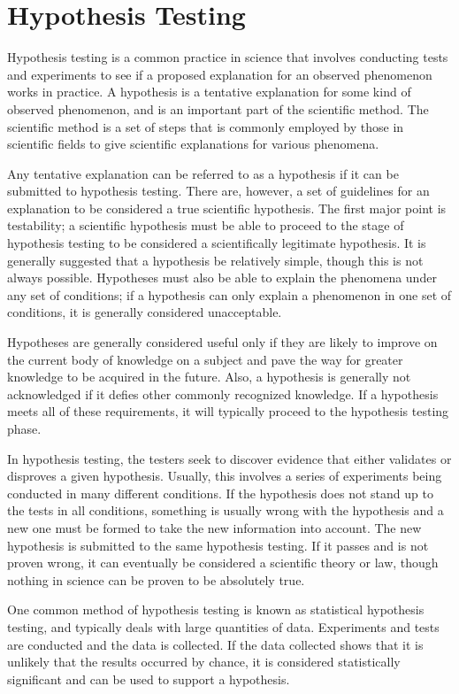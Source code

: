 \section{Hypothesis Testing}


Hypothesis testing is a common practice in science that involves conducting tests and experiments to see if a proposed explanation for an observed phenomenon works in practice. A hypothesis is a tentative explanation for some kind of observed phenomenon, and is an important part of the scientific method. The scientific method is a set of steps that is commonly employed by those in scientific fields to give scientific explanations for various phenomena.

Any tentative explanation can be referred to as a hypothesis if it can be submitted to hypothesis testing. There are, however, a set of guidelines for an explanation to be considered a true scientific hypothesis. The first major point is testability; a scientific hypothesis must be able to proceed to the stage of hypothesis testing to be considered a scientifically legitimate hypothesis. It is generally suggested that a hypothesis be relatively simple, though this is not always possible. Hypotheses must also be able to explain the phenomena under any set of conditions; if a hypothesis can only explain a phenomenon in one set of conditions, it is generally considered unacceptable.

Hypotheses are generally considered useful only if they are likely to improve on the current body of knowledge on a subject and pave the way for greater knowledge to be acquired in the future. Also, a hypothesis is generally not acknowledged if it defies other commonly recognized knowledge. If a hypothesis meets all of these requirements, it will typically proceed to the hypothesis testing phase.

In hypothesis testing, the testers seek to discover evidence that either validates or disproves a given hypothesis. Usually, this involves a series of experiments being conducted in many different conditions. If the hypothesis does not stand up to the tests in all conditions, something is usually wrong with the hypothesis and a new one must be formed to take the new information into account. The new hypothesis is submitted to the same hypothesis testing. If it passes and is not proven wrong, it can eventually be considered a scientific theory or law, though nothing in science can be proven to be absolutely true.

One common method of hypothesis testing is known as statistical hypothesis testing, and typically deals with large quantities of data. Experiments and tests are conducted and the data is collected. If the data collected shows that it is unlikely that the results occurred by chance, it is considered statistically significant and can be used to support a hypothesis.


